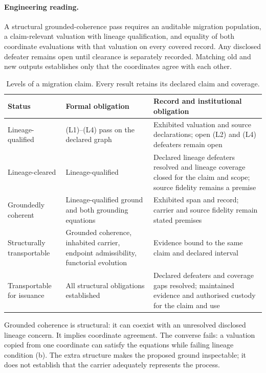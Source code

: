 \documentclass[smallextended,envcountsect,envcountsame,natbib]{svjour3}
\begin{document}
\paragraph{Engineering reading.} A structural grounded-coherence pass requires an auditable migration population, a claim-relevant valuation with lineage qualification, and equality of both coordinate evaluations with that valuation on every covered record. Any disclosed defeater remains open until clearance is separately recorded. Matching old and new outputs establishes only that the coordinates agree with each other.

\begin{table}[htbp]
\centering\small
\caption{Levels of a migration claim. Every result retains its declared claim and coverage.}
\label{ex:tab:claim-levels}
\begin{tabularx}{\textwidth}{@{}p{3.1cm}LL@{}}
\toprule
Status & Formal obligation & Record and institutional obligation \\
\midrule
Lineage-qualified & (L1)--(L4) pass on the declared graph & Exhibited valuation and source declarations; open (L2) and (L4) defeaters remain open \\
Lineage-cleared & Lineage-qualified & Declared lineage defeaters resolved and lineage coverage closed for the claim and scope; source fidelity remains a premise \\
Groundedly coherent & Lineage-qualified ground and both grounding equations & Exhibited span and record; carrier and source fidelity remain stated premises \\
Structurally transportable & Grounded coherence, inhabited carrier, endpoint admissibility, functorial evolution & Evidence bound to the same claim and declared interval \\
Transportable for issuance & All structural obligations established & Declared defeaters and coverage gaps resolved; maintained evidence and authorised custody for the claim and use \\
\bottomrule
\end{tabularx}
\end{table}

Grounded coherence is structural: it can coexist with an unresolved disclosed lineage concern. It implies coordinate agreement. The converse fails: a valuation copied from one coordinate can satisfy the equations while failing lineage condition (b). The extra structure makes the proposed ground inspectable; it does not establish that the carrier adequately represents the process.
\end{document}
